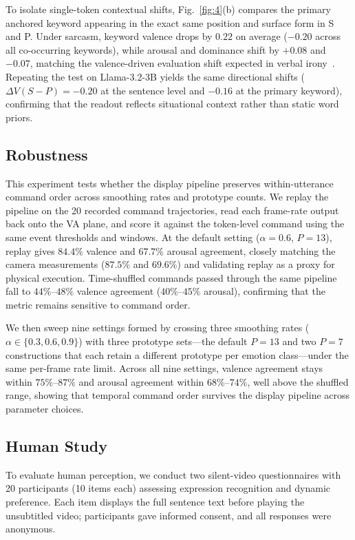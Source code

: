 \documentclass[letterpaper, 10 pt, conference]{ieeeconf/ieeeconf}
\begin{document}
To isolate single-token contextual shifts, Fig.~\ref{fig:4}(b) compares the primary anchored keyword appearing in the exact same position and surface form in S and P. Under sarcasm, keyword valence drops by $0.22$ on average ($-0.20$ across all co-occurring keywords), while arousal and dominance shift by $+0.08$ and $-0.07$, matching the valence-driven evaluation shift expected in verbal irony~\cite{leggitt2000emotional}. Repeating the test on Llama-3.2-3B yields the same directional shifts ($\Delta V(S{-}P)=-0.20$ at the sentence level and $-0.16$ at the primary keyword), confirming that the readout reflects situational context rather than static word priors.


\subsection{Robustness}
This experiment tests whether the display pipeline preserves within-utterance command order across smoothing rates and prototype counts. We replay the pipeline on the 20 recorded command trajectories, read each frame-rate output back onto the VA plane, and score it against the token-level command using the same event thresholds and windows. At the default setting ($\alpha{=}0.6$, $P{=}13$), replay gives $84.4\%$ valence and $67.7\%$ arousal agreement, closely matching the camera measurements ($87.5\%$ and $69.6\%$) and validating replay as a proxy for physical execution. Time-shuffled commands passed through the same pipeline fall to $44\%$--$48\%$ valence agreement ($40\%$--$45\%$ arousal), confirming that the metric remains sensitive to command order.

We then sweep nine settings formed by crossing three smoothing rates ($\alpha\in\{0.3,0.6,0.9\}$) with three prototype sets---the default $P{=}13$ and two $P{=}7$ constructions that each retain a different prototype per emotion class---under the same per-frame rate limit. Across all nine settings, valence agreement stays within $75\%$--$87\%$ and arousal agreement within $68\%$--$74\%$, well above the shuffled range, showing that temporal command order survives the display pipeline across parameter choices.

\subsection{Human Study}
\label{sec:exp_human}
To evaluate human perception, we conduct two silent-video questionnaires with 20 participants (10 items each) assessing expression recognition and dynamic preference. Each item displays the full sentence text before playing the unsubtitled video; participants gave informed consent, and all responses were anonymous.
\end{document}
